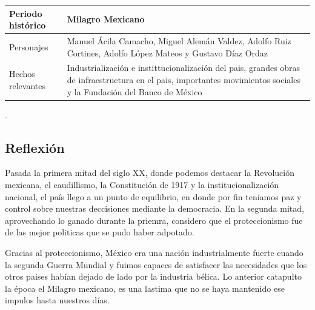 \documentclass[12pt]{article}
\begin{document}
	\begin{longtable}[]{@{}ll@{}}

		\begin{minipage}[b]{0.54\columnwidth}\raggedright
			Periodo histórico\strut
		\end{minipage} & 
			\begin{minipage}[b]{0.40\columnwidth}\raggedright
				Milagro Mexicano\strut
			\end{minipage}\tabularnewline
	
	\endhead
		
		\begin{minipage}[t]{0.54\columnwidth}\raggedright
			Personajes\strut
		\end{minipage} & 
			\begin{minipage}[t]{0.40\columnwidth}\raggedright
				Manuel Ácila Camacho, Miguel Alemán Valdez, Adolfo Ruiz Cortines, Adolfo López Mateos y Gustavo Díaz Ordaz\strut
			\end{minipage}\tabularnewline
	
		\begin{minipage}[t]{0.54\columnwidth}\raggedright
			Hechos relevantes\strut
		\end{minipage} & 
			\begin{minipage}[t]{0.40\columnwidth}\raggedright
				Industrialización e instittucionalización del pais, grandes obras de infraestructura en el pais, importantes movimientos sociales y la Fundación del Banco de México\strut
		\end{minipage}\tabularnewline

	\end{longtable}.\dotfill

\subsection*{Reflexi\'on}

\par Pasada la primera mitad del siglo XX, donde podemos destacar la Revolución mexicana, el caudillismo, la Constitución de 1917 y la institucionalización nacional, el país llego a un punto de equilibrio, en donde por fin teniamos paz y control sobre nuestras deccisiones mediante la democracia. En la segunda mitad, aprovechando lo ganado durante la priemra, considero que el proteccionismo fue de las mejor politicas que se pudo haber adpotado.

\par Gracias al proteccionismo, México era una nación industrialmente fuerte cuando la segunda Guerra Mundial y fuimos capaces de satisfacer las necesidades que los otros paises habían dejado de lado por la industria bélica. Lo anterior catapulto la época el Milagro mexicano, es una lastima que no se haya mantenido ese impulos hasta nuestros días.
\end{document}
